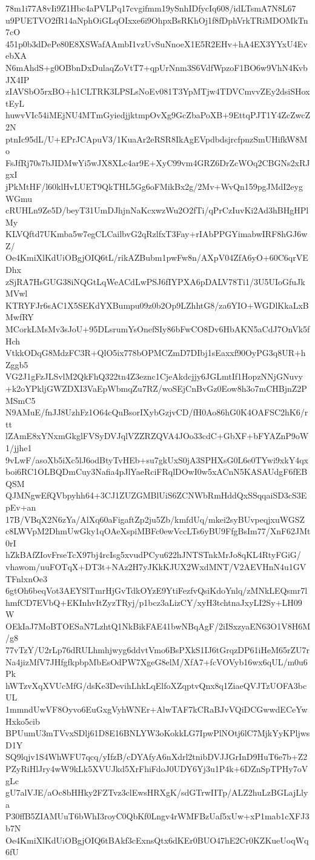 78m1i77A8vIi9Z1Hbc4aPVLPq17cvgifmm19ySnhIDfycIq608/idLTsmA7N8L67
u9PUETVO2fR14aNphOiGLqOIxxe6i9OhpxBsRKhOj1f8fDphVrkTRiMDOMkTn7cO
451p0b3dDePe80E8XSWafAAmbI1vzUvSuNnoeX1E5R2EHv+hA4EX3YYxU4EvebXA
N6mAhdS+g0OBbnDxDulaqZoVtT7+qpUrNnm3S6VdfWpzoF1BO6w9VhN4KvbJX4IP
zIAVSbO5rxBO+h1CLTRK3LPSLsNoEv081T3YpMTjw4TDVCmvvZEy2dsiSHoxtEyL
huwvVIc54iMEjNU4MTmGyiedjjktmpOvXg9GcZbaPoXB+9EttqPJT1Y4ZcZwcZ2N
ptnIc95dL/U+EPrJCApuV3/1KuaAr2eRSR8IkAgEVpdbdsjrcfpnzSmUHifkW8Mo
FsJfRj70s7bJIDMwYi5wJX8XLc4ar9E+XyC99vm4GRZ6DrZcWOq2CBGNs2xRJgxI
jPkMtHF/l60klHvLUET9QkTHL5Gg6oFMikBx2g/2Mv+WvQn159pgJMdI2eygWGmu
cRUHLn9Ze5D/beyT31UmDJhjnNaKcxwzWu2O2fTi/qPrCzIuvKi2Ad3hBHgHPlMy
KLVQftd7UKmba5w7egCLCailbvG2qRzlfxT3Fay+rIAbPPGYimabwIRF8hGJ6wZ/
Oe4KmiXlKdUiOBgjOIQ6tL/rikAZBubm1pwFw8n/AXpV04ZfA6yO+60C6qrVEDhx
zSjRA7HsGUG38iNQGtLqWeACdLwPSJ6fIYPXA6pDALV78Ti1/3U5UIoGfuJkMVwl
KTRYFJr6sAC1X5SEKdYXBumpu09z0b2Op9LZhhtG8/za6YIO+WGDlKkaLxBMwfRY
MCorkLMsMv3sJoU+95DLsrumYsOnefSIy86bFwCO8Dv6HbAKN5aCdJ7OnVk5fHch
VtkkODqG8MdzFC3R+QlO5ix778bOPMCZmD7DIbj1sEaxxf90OyPG3q8UR+hZggb5
VG2J1gFzJLSvlM2QkFhQ322tn4Z3eznc1CjeAkdcjjy6JGLmtIf1HopzNNjGNuvy
+k2oYPkljGWZDXI3VaEpWbmqZu7RZ/woSEjCnBvGz0Eow8h3o7mCHBjnZ2PMSmC5
N9AMuE/fnJJ8UzhFz1O64cQuBsorIXybGzjvCD/fH0Ao86hG0K4OAFSC2hK6/rtt
lZAmE8xYNxmGkglFVSyDVJqlVZZRZQVA4JOo33cdC+GbXF+bFYAZnP9oW1/jjhe1
9vLwF/asoXb5iXc5lJ6odBtyTvHEb+su7gkUxS0jA3SPHXsG0L6e0TYwi9xkY4qx
boi6RC1OLBQDmCuy3Nafia4pJlYaeRciFRqlDOwI0w5xACnN5KASAUdgF6fEBQSM
QJMNgwEfQVbpyhh64+3CJ1ZUZGMBlUiS6ZCNWbRmHddQxSSqqaiSD3cS3EpEv+an
17B/VBqX2N6zYa/AlXq60aFigaftZp2ju5Zb/kmfdUq/mkei2syBUvpeqjxuWGSZ
c8LWVpM2DhmUwGky1qOAeXspiMBFc0ewVccLTs6yBU9FfgBsIm77/XnF62JMt0rI
hZkBAfZIovFrseTcX97bj4rcIsg5xvudPCyu622hJNTSTnkMrJo8qKL4RtyFGiG/
vhawom/uuFOTqX+DT3t+NAz2H7yJKkKJUX2WxdMNT/V2AEVHnN4u1GVTFnlxnOe3
6gtOh6beqVot3AEYSlTmrHjGvTdkOYzE9YtiFezfvQsiKdoYnlq/zMNkLEQsmr7l
hmfCD7EVbQ+EKInhvItZyzTRyj/p1bcz3aLizCY/xyH3tchtnaJxyLI2Sy+LH09W
OEkIaJ7MoBTOESaN7LzhtQ1NkBikFAE41bwNBqAgF/2iISxzyaEN63O1V8H6M/g8
77vTzY/U2rLp76dRULhmhjwyg6ddvtVmo6BsPXkS1IJ6tGrqzDP61iHeM65rZU7r
Na4jizMfV7JHfgfkpbpMbEsOdPW7XgeG8elM/XfA7+fcVOVyb16wx6qUL/m0u6Pk
hWTzvXqXVUcMfG/dsKe3DevihLhkLqElfoXZqptvQnx8q1ZiaeQVJTzUOFA3bcUL
1mmndUwVF8Oyvo6EuGxgVyhWNEr+AlwTAF7kCRaBJvVQiDCGwwdECeYwHxko5cib
BPUumU3mTVvxSDlj61D8E16BNLYW3oKokkLG7IpwPlNOtj6lC7MjkYyKPljwsD1Y
SQ9lqjv1S4WhWFU7qcq/yIfzB/cDYAfyA6nXdrl2tnibDVJJGrInD9HuT6e7b+Z2
PZyRiHlJry4wW9kLk5XVUJkd5XrFhiFdoJ0UDY6Yj3u1P4k+6DZnSpTPHy7oVgLc
gU7alVJE/aOc8bHHky2FZTvz3clEwsHRXgK/sdGTrwIITp/ALZ2huLzBGLajLlya
P30ffB5ZIAMUuT6bWhI3royC0QbKf0Lngv4rWMFBzUaf5xUw+xP1mab1cXFJ3b7N
Oe4KmiXlKdUiOBgjOIQ6tBAkf3cExnsQtx6dKEr0BUO47hE2Cr0KZKueUoqWq6fU
